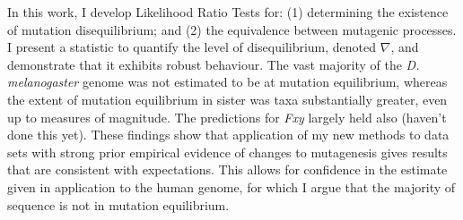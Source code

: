 In this work, I develop Likelihood Ratio Tests for: (1) determining the existence of mutation disequilibrium; and (2) the equivalence between mutagenic processes. I present a statistic to quantify the level of disequilibrium, denoted $\nabla$, and demonstrate that it exhibits robust behaviour. The vast majority of the \textit{D. melanogaster} genome was not estimated to be at mutation equilibrium, whereas the extent of mutation equilibrium in sister was taxa substantially greater, even up to measures of magnitude. The predictions for \textit{Fxy} largely held also (haven't done this yet). These findings show that application of my new methods to data sets with strong prior empirical evidence of changes to mutagenesis gives results that are consistent with expectations. This allows for confidence in the estimate given in application to the human genome, for which I argue that the majority of sequence is not in mutation equilibrium. 